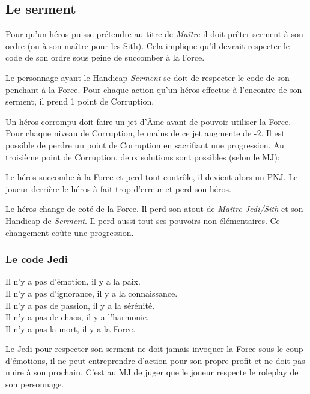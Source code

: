 \subsection{Le serment}
\label{sec:force-serment}
Pour qu’un héros puisse prétendre au titre de \emph{Maître} il doit prêter serment à son ordre (ou à son maître pour les Sith). Cela implique qu’il devrait respecter le code de son ordre sous peine de succomber à la Force.

Le personnage ayant le Handicap \emph{Serment} se doit de respecter le code de son penchant à la Force. Pour chaque action qu’un héros effectue à l’encontre de son serment, il prend 1 point de Corruption. 

Un héros corrompu doit faire un jet d’\^Ame avant de pouvoir utiliser la Force. Pour chaque niveau de Corruption, le malus de ce jet augmente de -2. Il est possible de perdre un point de Corruption en sacrifiant une progression. Au troisième point de Corruption, deux solutions sont possibles (selon le MJ):

\begin{description}[align=left] 
    \item [Perte de contrôle]
        Le héros succombe à la Force et perd tout contrôle, il devient alors un PNJ. Le joueur derrière le héros à fait trop d’erreur et perd son héros.

    \item [Changement de coté]
    	Le héros change de coté de la Force. Il perd son atout de \emph{Maître Jedi/Sith} et son Handicap de \emph{Serment}. Il perd aussi tout ses pouvoirs non élémentaires. Ce changement coûte une progression.
\end{description}

\subsubsection{Le code Jedi}
\begin{quotebox}
Il n’y a pas d’émotion, il y a la paix. \\
Il n’y a pas d’ignorance, il y a la connaissance. \\ 
Il n’y a pas de passion, il y a la sérénité. \\ 
Il n’y a pas de chaos, il y a l’harmonie. \\ 
Il n’y a pas la mort, il y a la Force. 
\end{quotebox}

Le Jedi pour respecter son serment ne doit jamais invoquer la Force sous le coup d’émotions, il ne peut entreprendre d’action pour son propre profit et ne doit pas nuire à son prochain. C’est au MJ de juger que le joueur respecte le roleplay de son personnage.

